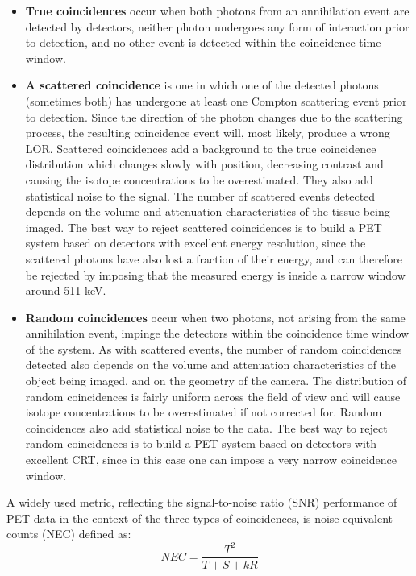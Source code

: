 \documentclass[review]{elsarticle}
\begin{document}
\begin{itemize}
\item {\bf True coincidences} occur when both photons from an annihilation event are detected by detectors, neither photon undergoes any form of interaction prior to detection, and no other event is detected within the coincidence time-window.
\item {\bf A scattered coincidence} is one in which one of the detected photons (sometimes both) has undergone at least one Compton scattering event prior to detection. Since the direction of the photon changes due to the scattering process, the resulting coincidence event will, most likely, produce a wrong LOR. Scattered coincidences add a background to the true coincidence distribution which changes slowly with position, decreasing contrast and causing the isotope concentrations to be overestimated. They also add statistical noise to the signal. The number of scattered events detected depends on the volume and attenuation characteristics of the tissue being imaged. The best way to reject scattered coincidences is to build a PET system based on detectors with excellent energy resolution, since the scattered photons have also lost a fraction of their energy, and can therefore be rejected by imposing that the measured energy is inside a narrow window around 511 keV.
\item {\bf Random coincidences} occur when two photons, not arising from the same annihilation event, impinge the detectors within the coincidence time window of the system. As with scattered events, the number of random coincidences detected also depends on the volume and attenuation characteristics of the object being imaged, and on the geometry of the camera. The distribution of random coincidences is fairly uniform across the field of view and will cause isotope concentrations to be overestimated if not corrected for. Random coincidences also add statistical noise to the data. The best way to reject random coincidences is to build a PET system based on detectors with excellent CRT, since in this case one can impose a very narrow coincidence window. 
\end{itemize}

 A widely used
metric, reflecting the signal-to-noise ratio (SNR) performance of PET data in the context of
the three types of coincidences, is noise equivalent counts (NEC) defined as: 
%
\begin{equation}
NEC = \frac{T^2}{T+S+kR}
\label{eq.neq}
\end{equation}
\end{document}
